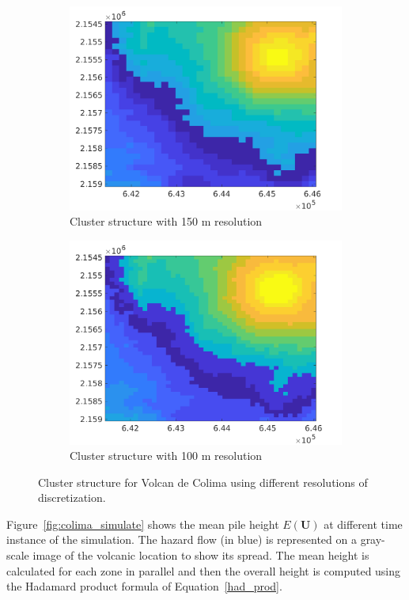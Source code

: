 \begin{figure}[H]
\begin{subfigure}{0.48\textwidth}
\includegraphics[width=\textwidth]{dem_figs/colima_cluster_150}
\caption{Cluster structure with 150 m resolution}
\label{colima_cluster_150}
\end{subfigure}
\centering
\begin{subfigure}{0.48\textwidth}
\includegraphics[width=\textwidth]{dem_figs/colima_cluster_100}
\caption{Cluster structure with 100 m resolution}
\label{colima_cluster_100}
\end{subfigure} 
\caption{Cluster structure for Volcan de Colima using different resolutions of discretization.}
\label{fig:colima_cluster}
\end{figure}

Figure~\ref{fig:colima_simulate} shows the mean pile height $E(\textbf{U})$ at different time instance of the simulation. The hazard flow (in blue) is represented on a gray-scale image of the volcanic location to show its spread. The mean height is calculated for each zone in parallel and then the overall height is computed using the Hadamard product formula of Equation~\ref{had_prod}.

